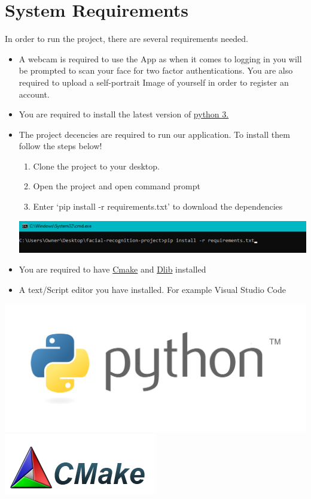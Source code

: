 \documentclass{article}
\begin{document}
\newpage

\section{System Requirements}
In order to run the project, there are several requirements needed.
\begin{itemize}
  \item A webcam is required to use the App as when it comes to logging in you will be prompted to scan your face for two factor authentications.  You are also required to upload a self-portrait Image of yourself in order to register an account.
  \item You are required to install the latest version of \href{https://www.python.org/downloads/}{python 3.}\cite{python}
  \item The project decencies are required to run our application. To install them follow the steps below! 
    \begin{enumerate}
    \item Clone the project to your desktop.
    \item Open the project and open command prompt
    \item Enter ‘pip install -r requirements.txt’ to download the dependencies
    \end{enumerate}
    \begin{center}
        \includegraphics[scale=0.8]{images/requirementsInstall.png}
    \end{center}
  \item You are required to have \cite{cmake}\href{https://cmake.org/}{Cmake} and \cite{dlib}\href{http://dlib.net/}{Dlib} installed
  \item A text/Script editor you have installed. For example Visual Studio Code
\end{itemize}

\begin{center}
\includegraphics[scale=0.10]{./images/Python-logo.png}
\\
\includegraphics[scale=0.7]{images/cmake75.png}
\end{center}
\end{document}
